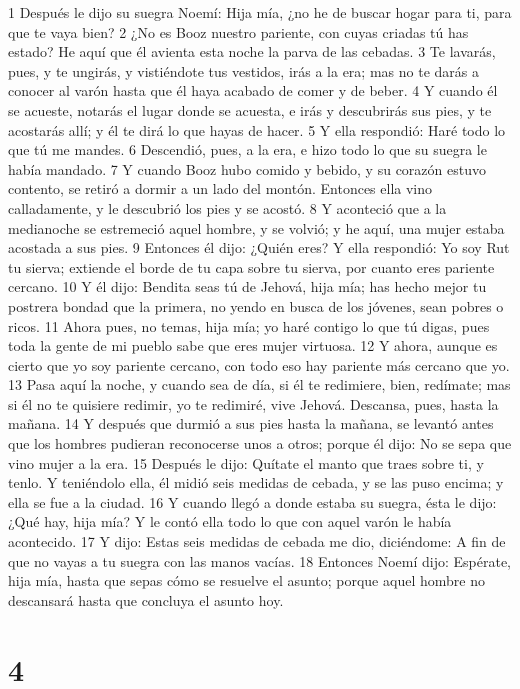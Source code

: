 1 Después le dijo su suegra Noemí: Hija mía, ¿no he de buscar hogar para ti, para que te vaya bien?
2 ¿No es Booz nuestro pariente, con cuyas criadas tú has estado? He aquí que él avienta esta noche la parva de las cebadas.
3 Te lavarás, pues, y te ungirás, y vistiéndote tus vestidos, irás a la era; mas no te darás a conocer al varón hasta que él haya acabado de comer y de beber.
4 Y cuando él se acueste, notarás el lugar donde se acuesta, e irás y descubrirás sus pies, y te acostarás allí; y él te dirá lo que hayas de hacer.
5 Y ella respondió: Haré todo lo que tú me mandes.
6 Descendió, pues, a la era, e hizo todo lo que su suegra le había mandado.
7 Y cuando Booz hubo comido y bebido, y su corazón estuvo contento, se retiró a dormir a un lado del montón. Entonces ella vino calladamente, y le descubrió los pies y se acostó.
8 Y aconteció que a la medianoche se estremeció aquel hombre, y se volvió; y he aquí, una mujer estaba acostada a sus pies.
9 Entonces él dijo: ¿Quién eres? Y ella respondió: Yo soy Rut tu sierva; extiende el borde de tu capa sobre tu sierva, por cuanto eres pariente cercano.
10 Y él dijo: Bendita seas tú de Jehová, hija mía; has hecho mejor tu postrera bondad que la primera, no yendo en busca de los jóvenes, sean pobres o ricos.
11 Ahora pues, no temas, hija mía; yo haré contigo lo que tú digas, pues toda la gente de mi pueblo sabe que eres mujer virtuosa.
12 Y ahora, aunque es cierto que yo soy pariente cercano, con todo eso hay pariente más cercano que yo.
13 Pasa aquí la noche, y cuando sea de día, si él te redimiere, bien, redímate; mas si él no te quisiere redimir, yo te redimiré, vive Jehová. Descansa, pues, hasta la mañana.
14 Y después que durmió a sus pies hasta la mañana, se levantó antes que los hombres pudieran reconocerse unos a otros; porque él dijo: No se sepa que vino mujer a la era.
15 Después le dijo: Quítate el manto que traes sobre ti, y tenlo. Y teniéndolo ella, él midió seis medidas   de cebada, y se las puso encima; y ella se fue a la ciudad.
16 Y cuando llegó a donde estaba su suegra, ésta le dijo: ¿Qué hay, hija mía? Y le contó ella todo lo que con aquel varón le había acontecido.
17 Y dijo: Estas seis medidas   de cebada me dio, diciéndome: A fin de que no vayas a tu suegra con las manos vacías.
18 Entonces Noemí dijo: Espérate, hija mía, hasta que sepas cómo se resuelve el asunto; porque aquel hombre no descansará hasta que concluya el asunto hoy.

\chapter{4}

